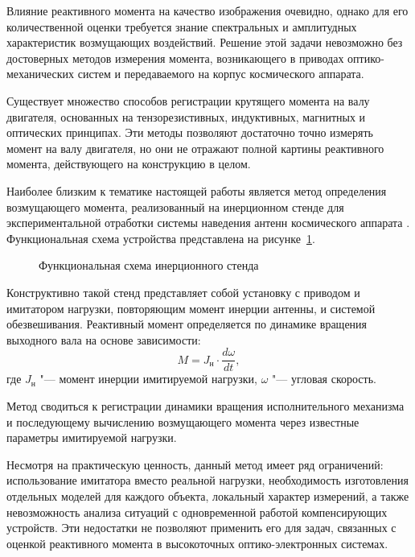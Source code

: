 Влияние реактивного момента на качество изображения очевидно, однако для его количественной оценки требуется знание спектральных и амплитудных характеристик возмущающих воздействий. Решение этой задачи невозможно без достоверных методов измерения момента, возникающего в приводах оптико-механических систем и передаваемого на корпус космического аппарата.

Существует множество способов регистрации крутящего момента на валу двигателя, основанных на тензорезистивных, индуктивных, магнитных и оптических принципах. Эти методы позволяют достаточно точно измерять момент на валу двигателя, но они не отражают полной картины реактивного момента, действующего на конструкцию в целом.

Наиболее близким к тематике настоящей работы является метод определения возмущающего момента, реализованный на инерционном стенде для экспериментальной отработки системы наведения антенн космического аппарата \cite{Goncharuk2013}. Функциональная схема устройства представлена на рисунке~\cref{fig:stand}.

\begin{figure}[h!] 
	\caption{Функциональная схема инерционного стенда}
	\label{fig:stand} 
\end{figure}
Конструктивно такой стенд представляет собой установку с приводом и имитатором нагрузки, повторяющим момент инерции антенны, и системой обезвешивания. Реактивный момент определяется по динамике вращения выходного вала на основе зависимости:
\begin{equation*}
	\label{eq:eq_M_disturb}
	M=J_{\text{н}}\cdot \frac{d\omega}{dt},
\end{equation*}
где \(J_{\text{н}}\) "--- момент инерции имитируемой нагрузки, \(\omega\) "--- угловая скорость.

Метод сводиться к регистрации динамики вращения исполнительного механизма и последующему вычислению возмущающего момента через известные параметры имитируемой нагрузки.

Несмотря на практическую ценность, данный метод имеет ряд ограничений: использование имитатора вместо реальной нагрузки, необходимость изготовления отдельных моделей для каждого объекта, локальный характер измерений, а также невозможность анализа ситуаций с одновременной работой компенсирующих устройств. Эти недостатки не позволяют применить его для задач, связанных с оценкой реактивного момента в высокоточных оптико-электронных системах.

